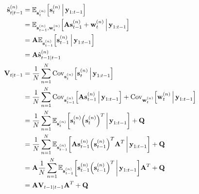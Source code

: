 		\begin{align*}
			\hat{\vec{s}}_{t \subgiven t - 1}^{(n)}
				&= \E_{\vec{s}_t^{(n)}}\Big[\vec{s}_t^{(n)} \Biggiven \vec{y}_{1:t - 1}\Big] \\
				&= \E_{\vec{s}_{t - 1}^{(n)}, \vec{w}_t^{(n)}}\Big[\mat{A} \vec{s}_{t - 1}^{(n)} + \vec{w}_t^{(n)} \Biggiven \vec{y}_{1:t - 1}\Big] \\
				&= \mat{A} \E_{\vec{s}_{t - 1}^{(n)}}\Big[\vec{s}_{t - 1}^{(n)} \Biggiven \vec{y}_{1:t - 1}\Big] \\
				&= \mat{A} \hat{\vec{s}}_{t - 1 \subgiven t - 1}^{(n)} \\
			\mat{V}_{t \subgiven t - 1}
				&= \frac{1}{N} \sum_{n = 1}^{N} \Cov_{\vec{s}_t^{(n)}}\!\Big[\vec{s}_t^{(n)} \Biggiven \vec{y}_{1:t - 1}\Big] \\
				&= \frac{1}{N} \sum_{n = 1}^{N} \Cov_{\vec{s}_{t - 1}^{(n)}}\!\Big[\mat{A} \vec{s}_{t - 1}^{(n)} \Biggiven \vec{y}_{1:t - 1}\Big] + \Cov_{\vec{w}_t^{(n)}}\!\Big[\vec{w}_t^{(n)} \Biggiven \vec{y}_{1:t - 1}\Big] \\
				&= \frac{1}{N} \sum_{n = 1}^{N} \E_{\vec{s}_t^{(n)}}\bigg[\vec{s}_t^{(n)} \Big(\vec{s}_t^{(n)}\Big)^T \bigggiven \vec{y}_{1:t - 1}\bigg] + \mat{Q} \\
				&= \frac{1}{N} \sum_{n = 1}^{N} \E_{\vec{s}_{t - 1}^{(n)}}\bigg[\mat{A} \vec{s}_{t - 1}^{(n)} \Big(\vec{s}_{t - 1}^{(n)}\Big)^T \mat{A}^T \bigggiven \vec{y}_{1:t - 1}\bigg] + \mat{Q} \\
				&= \mat{A} \frac{1}{N} \sum_{n = 1}^{N} \E_{\vec{s}_{t - 1}^{(n)}}\bigg[\vec{s}_{t - 1}^{(n)} \Big(\vec{s}_{t - 1}^{(n)}\Big)^T \bigggiven \vec{y}_{1:t - 1}\bigg] \mat{A}^T + \mat{Q} \\
				&= \mat{A} \mat{V}_{t - 1 \subgiven t - 1} \mat{A}^T + \mat{Q}
		\end{align*}

